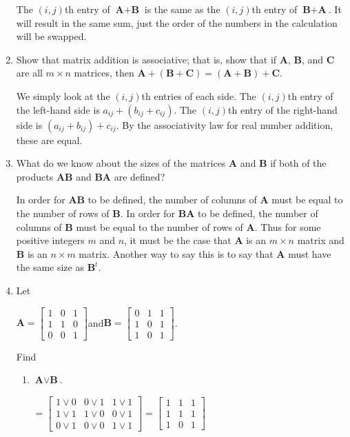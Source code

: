 \documentclass[11pt]{article}
\begin{document}
\begin{enumerate}[label=\textbf{\arabic*.}]
	The $(i, j)$th entry of $\textbf{A} + \textbf{B}$ is the same as the $(i, j)$th entry of $\textbf{B} + \textbf{A}$. It will result in the same sum, just the order of the numbers in the calculation will be swapped.
	
	\item Show that matrix addition is associative; that is, show that if \textbf{A}, \textbf{B}, and \textbf{C} are all $m \times n$ matrices, then $\textbf{A} + (\textbf{B} + \textbf{C}) = (\textbf{A} + \textbf{B}) + \textbf{C}$.
		
	We simply look at the $(i, j)$th entries of each side. The $(i, j)$th entry of the left-hand side is $a_{ij} + (b_{ij} + c_{ij})$. The $(i, j)$th entry of the right-hand side is $(a_{ij} + b_{ij}) + c_{ij}$. By the associativity law for real number addition, these are equal.
	
	\pagebreak
	\item What do we know about the sizes of the matrices \textbf{A} and \textbf{B} if both of the products \textbf{AB} and \textbf{BA} are defined?
	
	In order for \textbf{AB} to be defined, the number of columns of \textbf{A} must be equal to the number of rows of \textbf{B}. In order for \textbf{BA} to be defined, the number of columns of \textbf{B} must be equal to the number of rows of \textbf{A}. Thus for some positive integers $m$ and $n$, it must be the case that \textbf{A} is an $m \times n$ matrix and \textbf{B} is an $n \times m$ matrix. Another way to say this is to say that \textbf{A} must have the same size as $\textbf{B}^t$.
	
	\item Let
	
	$\textbf{A} = 
	\begin{bmatrix}
		1 & 0 & 1 \\
		1 & 1 & 0 \\
		0 & 0 & 1
	\end{bmatrix}$\quad and\quad $\textbf{B} = 
	\begin{bmatrix}
		0 & 1 & 1 \\
		1 & 0 & 1 \\
		1 & 0 & 1
	\end{bmatrix}$.

	Find
	
	\begin{enumerate}[label=\textbf{\alph*)}]
		\item $\textbf{A} \lor \textbf{B}$.
		
		$=
		\begin{bmatrix}
			1 \lor 0 & 0 \lor 1 & 1 \lor 1 \\
			1 \lor 1 & 1 \lor 0 & 0 \lor 1 \\
			0 \lor 1 & 0 \lor 0 & 1 \lor 1
		\end{bmatrix} =
		\begin{bmatrix}
			1 & 1 & 1 \\
			1 & 1 & 1 \\
			1 & 0 & 1
		\end{bmatrix}$
		

\end{enumerate}
\end{enumerate}
\end{document}
